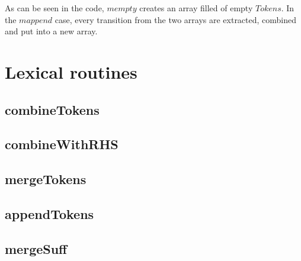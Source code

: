 As can be seen in the code, $mempty$ creates an array filled
of empty $Tokens$. In the $mappend$ case, every transition from the two arrays
are extracted, combined and put into a new array.

\section{Lexical routines}
\subsection{combineTokens}
\subsection{combineWithRHS}
\subsection{mergeTokens}
\subsection{appendTokens}
\subsection{mergeSuff}
